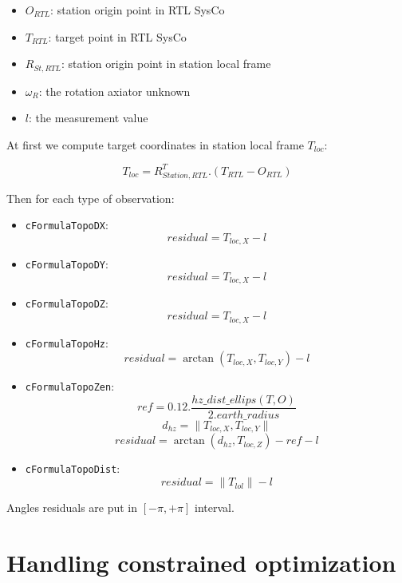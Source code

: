  \begin{itemize}
    \item $O_{RTL}$: station origin point in RTL SysCo
    \item $T_{RTL}$: target point in RTL SysCo
    \item $R_{St, RTL}$: station origin point in station local frame
    \item $\omega_R$: the rotation axiator unknown
    \item $l$: the measurement value
 \end{itemize}

 At first we compute target coordinates in station local frame $T_{loc}$:

 $$  T_{loc} = R_{Station, RTL}^T . (T_{RTL} - O_{RTL})  $$

 Then for each type of observation:
 
 \begin{itemize}
    \item {\tt cFormulaTopoDX}: $$ residual = T_{loc,X} - l$$
    \item {\tt cFormulaTopoDY}: $$ residual = T_{loc,X} - l$$
    \item {\tt cFormulaTopoDZ}: $$ residual = T_{loc,X} - l$$

    \item {\tt cFormulaTopoHz}: $$ residual =  \arctan\left(T_{loc,X}, T_{loc,Y}\right) - l $$
    \item {\tt cFormulaTopoZen}:
    $$ ref = 0.12 . \frac { hz\_dist\_ellips\left( T, O \right) }
                          { 2 . earth\_radius} $$
    $$ d_{hz} =  \| T_{loc,X}, T_{loc,Y} \| $$
    $$ residual =  \arctan\left(d_{hz}, T_{loc,Z}\right) - ref - l $$
    \item {\tt cFormulaTopoDist}: $$  residual =  \| T_{lol} \| - l $$

 \end{itemize}

 Angles residuals are put in $ [ -\pi, + \pi ] $ interval.



\section{Handling constrained optimization}


